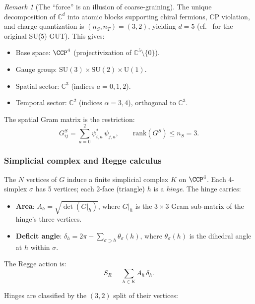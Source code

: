 \documentclass[12pt]{article}
\theoremstyle{remark}
\newtheorem{remark}[theorem]{Remark}
\theoremstyle{definition}
\newcommand{\CC}{\mathbb{C}}
\begin{document}
\begin{remark}[The ``force'' is an illusion of coarse-graining]
The unique decomposition of $\CC^d$ into atomic blocks supporting
chiral fermions, CP violation, and charge quantization is
$(n_S, n_T) = (3, 2)$, yielding $d = 5$ 
(cf.\ \cite{GeorgiGlashow} for the original SU(5) GUT). This gives:

\begin{itemize}
\item Base space: $\CCP^4$ (projectivization of
  $\CC^5 \setminus \{0\}$).
\item Gauge group: $\mathrm{SU}(3) \times \mathrm{SU}(2) \times
  \mathrm{U}(1)$.
\item Spatial sector: $\CC^3$ (indices $a = 0, 1, 2$).
\item Temporal sector: $\CC^2$ (indices $\alpha = 3, 4$),
  orthogonal to $\CC^3$.
\end{itemize}

The spatial Gram matrix is the restriction:
\begin{equation}
G^S_{ij} = \sum_{a=0}^{2} \psi^*_{i,a}\, \psi_{j,a}, \qquad
\mathrm{rank}(G^S) \leq n_S = 3.
\label{eq:GS}
\end{equation}

\subsubsection{Simplicial complex and Regge calculus}

The $N$ vertices of $G$ induce a finite simplicial complex $K$ on
$\CCP^4$. Each 4-simplex $\sigma$ has 5 vertices; each 2-face
(triangle) $h$ is a \emph{hinge}. The hinge carries:

\begin{itemize}
\item \textbf{Area}: $A_h = \sqrt{\det(G|_h)}$, where $G|_h$ is the
  $3 \times 3$ Gram sub-matrix of the hinge's three vertices.
\item \textbf{Deficit angle}: $\delta_h = 2\pi -
  \sum_{\sigma \supset h} \theta_\sigma(h)$, where $\theta_\sigma(h)$
  is the dihedral angle at $h$ within $\sigma$.
\end{itemize}

\noindent
The Regge action \cite{Regge} is:
\begin{equation}
\boxed{S_R = \sum_{h \in K} A_h\, \delta_h.}
\label{eq:Regge_YM}
\end{equation}

Hinges are classified by the $(3,2)$ split of their vertices:


\end{remark}
\end{document}
